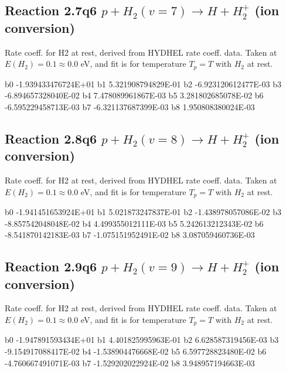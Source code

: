 \documentclass[12pt,dvipdfmx]{article}
\begin{document}
\newpage
\subsection{
Reaction 2.7q6
$ p + H_2(v=7) \rightarrow H + H_2^+$ (ion conversion)
}
Rate coeff. for H2 at rest, derived from HYDHEL rate coeff. data.
Taken at $E(H_2) = 0.1 \approx 0.0$ eV,  and fit is for temperature $T_p=T$ with $H_2$ at rest.

\begin{{small}}\begin{{verbatim}}

  b0 -1.939433476724E+01  b1  5.321908794829E-01  b2 -6.923120612477E-03
  b3 -6.894657328040E-02  b4  7.478089961867E-03  b5  3.281802685078E-02
  b6 -6.595229458713E-03  b7 -6.321137687399E-03  b8  1.950808380024E-03

\end{{verbatim}}\end{{small}}

\newpage
\subsection{
Reaction 2.8q6
$ p + H_2(v=8) \rightarrow H + H_2^+$ (ion conversion)
}
Rate coeff. for H2 at rest, derived from HYDHEL rate coeff. data.
Taken at $E(H_2) = 0.1 \approx 0.0$ eV,  and fit is for temperature $T_p=T$ with $H_2$ at rest.

\begin{{small}}\begin{{verbatim}}

  b0 -1.941451653924E+01  b1  5.021873247837E-01  b2 -1.438978057086E-02
  b3 -8.857542048048E-02  b4  4.499355012111E-03  b5  5.242613212343E-02
  b6 -8.541870142183E-03  b7 -1.075151952491E-02  b8  3.087059460736E-03

\end{{verbatim}}\end{{small}}

\newpage
\subsection{
Reaction 2.9q6
$ p + H_2(v=9) \rightarrow H + H_2^+$ (ion conversion)
}
Rate coeff. for H2 at rest, derived from HYDHEL rate coeff. data.
Taken at $E(H_2) = 0.1 \approx 0.0$ eV,  and fit is for temperature $T_p=T$ with $H_2$ at rest.

\begin{{small}}\begin{{verbatim}}

  b0 -1.947891593434E+01  b1  4.401825995963E-01  b2  6.628587319456E-03
  b3 -9.154917088417E-02  b4 -1.538904476668E-02  b5  6.597728823480E-02
  b6 -4.760667491071E-03  b7 -1.529202022924E-02  b8  3.948957194663E-03

\end{{verbatim}}\end{{small}}
\end{document}
